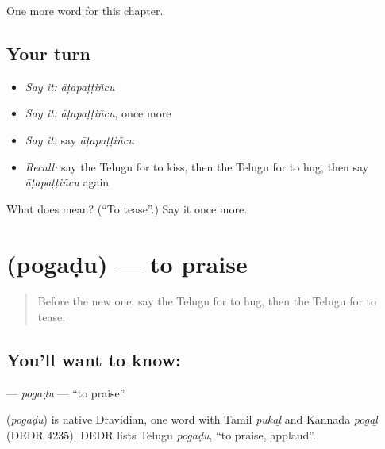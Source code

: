\begin{grammarlens}[title={What you've built}]
One more word for this chapter.
\end{grammarlens}

\subsection*{Your turn}
\begin{itemize}
\raggedright
  \item \emph{Say it:} \emph{āṭapaṭṭiñcu}
  \item \emph{Say it:} \emph{āṭapaṭṭiñcu}, once more
  \item \emph{Say it:} say \emph{āṭapaṭṭiñcu}
  \item \emph{Recall:} say the Telugu for to kiss, then the Telugu for to hug, then say \emph{āṭapaṭṭiñcu} again
\end{itemize}

\begin{tcolorbox}[breakable,colback=teal!4,colframe=teal!35!black,title={Before you move on}]
What does  mean? (\textquotedblleft{}To tease\textquotedblright{}.) Say it once more.
\end{tcolorbox}
\section[\texorpdfstring{\te{పొగడు} (pogaḍu)}{పొగడు (pogaḍu)}]{ (pogaḍu) — to praise}

\label{lesson:TE-C162-pogadu}



\begin{quote}
Before the new one: say the Telugu for to hug, then the Telugu for to tease.
\end{quote}

\subsection*{You'll want to know: }
\textbf{} — \emph{pogaḍu} — \textquotedblleft{}to praise\textquotedblright{}.

\begin{cousinweb}
\textbf{} (\emph{pogaḍu}) is native Dravidian, one word with Tamil \emph{pukaḻ} and Kannada \emph{pogaḻ} (DEDR 4235). DEDR lists Telugu \emph{pogaḍu}, \textquotedblleft{}to praise, applaud\textquotedblright{}.
\end{cousinweb}

